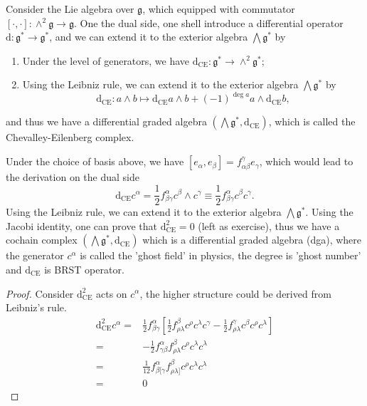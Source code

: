\documentclass[10pt]{article}
\begin{document}
Consider the Lie algebra over $ \mathfrak{g}$, which equipped with commutator $[\cdot, \cdot] : \wedge^{2} \mathfrak{g} \rightarrow \mathfrak{g}$. One the dual side, one shell introduce a differential operator $ \mathrm{d} : \mathfrak{g}^{*} \rightarrow \mathfrak{g}^{*}$, and we can extend it to the exterior algebra $ \bigwedge \mathfrak{g}^{*}$ by
\begin{enumerate}[(1)]
  \item Under the level of generators, we have $ \mathrm{d} _{\mathrm{CE}} : \mathfrak{g}^{*} \rightarrow \wedge^{2} \mathfrak{g}^{*}$;
  \item Using the Leibniz rule, we can extend it to the exterior algebra $ \bigwedge \mathfrak{g}^{*}$ by
    \begin{equation*}
      \mathrm{d} _{\mathrm{CE}} : a \wedge b \mapsto \mathrm{d} _{\mathrm{CE}} a \wedge b + (-1)^{\deg a} a \wedge \mathrm{d} _{\mathrm{CE}} b,
    \end{equation*}
\end{enumerate}
and thus we have a differential graded algebra $ \left( \bigwedge \mathfrak{g}^{*}, \mathrm{d} _{\mathrm{CE}} \right)$, which is called the Chevalley-Eilenberg complex.

Under the choice of basis above, we have $[e_{\alpha} , e_{\beta}] = f^{\gamma}_{\alpha \beta} e_{\gamma}$, which would lead to the derivation on the dual side
\begin{equation*}
  \mathrm{d} _{\mathrm{CE}} c^{\alpha} = \frac{1}{2} f^{\alpha}_{\beta \gamma} c^{\beta} \wedge c^{\gamma} \equiv \frac{1}{2}f^{\alpha}_{\beta \gamma} c^{\beta}c^{\gamma}.
\end{equation*}
Using the Leibniz rule, we can extend it to the exterior algebra $ \bigwedge \mathfrak{g}^{*}$. Using the Jacobi identity, one can prove that $ \mathrm{d} _{\mathrm{CE}}^{2} = 0$ (left as exercise), thus we have a cochain complex $\left( \bigwedge \mathfrak{g}^{*}, \mathrm{d} _{\mathrm{CE}} \right)$ which is a differential graded algebra (dga),
where the generator $ c^{\alpha} $ is called the 'ghost field' in physics, the degree is 'ghost number' and $ \mathrm{d} _{\mathrm{CE}}$ is BRST operator.
\begin{proof}
  Consider $ \mathrm{d} _{\mathrm{CE}}^{2}$ acts on $ c^{\alpha}$, the higher structure could be derived from Leibniz's rule.
  \begin{equation*}
    \begin{aligned}
      \mathrm{d} ^{2}_{\mathrm{CE}} c^{\alpha} = & \frac{1}{2} f^{\alpha}_{\beta \gamma} \left[ \frac{1}{2} f^{\beta}_{\rho \lambda} c^{\rho} c^{\lambda} c^{\gamma} - \frac{1}{2} f^{\gamma}_{\rho \lambda} c^{\beta} c^{\rho} c^{\lambda} \right] \\
      = & - \frac{1}{2} f^{\alpha}_{\gamma \beta} f^{\beta}_{\rho \lambda} c^{\rho} c^{\lambda} c^{\lambda} \\
      = & \frac{1}{12} f_{\beta [\gamma}^{\alpha} f_{\rho \lambda]}^{\beta} c^{\rho} c^{\lambda} c^{\lambda} \\
      = & 0
    \end{aligned}
  \end{equation*}
\end{proof}
\end{document}

